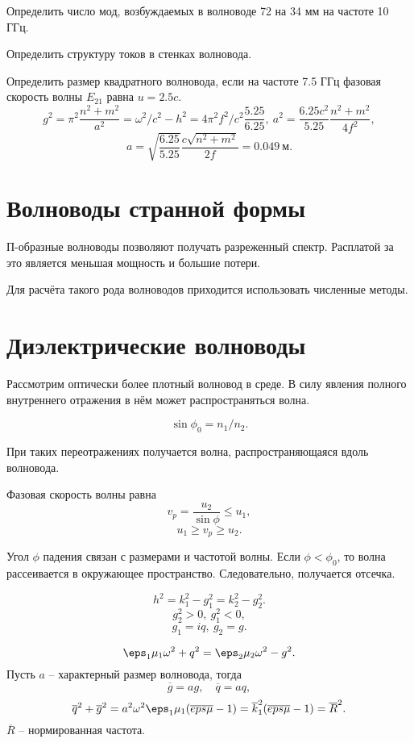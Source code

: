 Определить число мод, возбуждаемых в волноводе 72 на 34 мм на частоте 10 ГГц.

Определить структуру токов в стенках волновода.

Определить размер квадратного волновода, если на частоте 7.5 ГГц фазовая скорость волны \(E_{21}\) равна \( u = 2.5c \).
\[
	g^2 = \pi^2\frac{n^2 + m^2}{a^2} = \omega^2/c^2 - h^2 = 4\pi^2f^2/c^2 \frac{5.25}{6.25},\ a^2 = \frac{6.25 c^2}{5.25}\frac{n^2 + m^2}{4f^2},
\]
\[
	a = \sqrt{\frac{6.25}{5.25}}\frac{c\sqrt{n^2 + m^2}}{2f} = 0.049~\text{м}.
\]

\section{Волноводы странной формы}

П-образные волноводы позволяют получать разреженный спектр. Расплатой за это является меньшая мощность и большие потери.

Для расчёта такого рода волноводов приходится использовать численные методы.


\section{Диэлектрические волноводы}

Рассмотрим оптически более плотный волновод в среде. В силу явления полного внутреннего отражения в нём может распространяться волна.

\[
	\sin\phi_0 = n_1 / n_2.
\]

При таких переотражениях получается волна, распространяющаяся вдоль волновода.

Фазовая скорость волны равна
\[
	v_p = \frac{u_2}{\sin\phi} \le u_1,
\]
\[
	u_1 \ge v_p \ge u_2.
\]

Угол \( \phi \) падения связан с размерами и частотой волны. Если \( \phi < \phi_0 \), то волна рассеивается в окружающее пространство. Следовательно, получается отсечка.

\[
	h^2 = k_1^2 - g_1^2 = k_2^2 - g_2^2.
\]
\[
	g_2^2 > 0,\ g_1^2 < 0,
\]
\[
	g_1 = iq,\ g_2 = g.
\]

\[
	\eps_1\mu_1\omega^2 + q^2 = \eps_2\mu_2\omega^2 - g^2.
\]
Пусть \( a \) -- характерный размер волновода, тогда
\[
	\overline{g} = ag,\quad \overline{q} = aq,
\]
\[
	\overline{q}^2 + \overline{g}^2 = a^2\omega^2\eps_1\mu_1(\overline{eps}\overline{\mu} - 1) = \overline{k}_1^2(\overline{eps}\overline{\mu} - 1) = \overline{R}^2.
\]
\(\overline{R}\) -- нормированная частота.